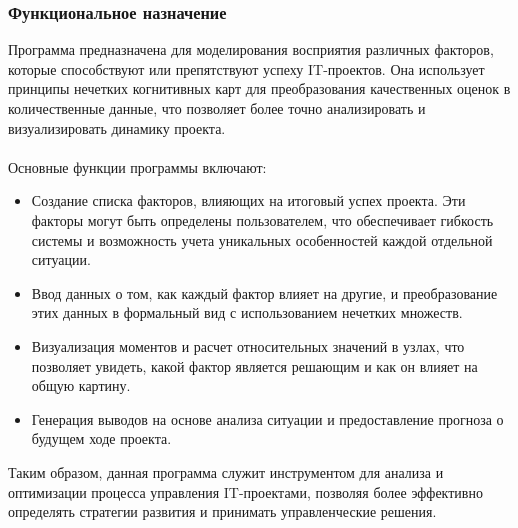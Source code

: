 \documentclass{article}
\begin{document}
    \subsubsection {Функциональное назначение}
    Программа предназначена для моделирования восприятия различных факторов, которые способствуют или препятствуют успеху IT-проектов. Она использует принципы нечетких когнитивных карт для преобразования качественных оценок в количественные данные, что позволяет более точно анализировать и визуализировать динамику проекта.\\
    ~\\
    Основные функции программы включают:
    \begin{itemize}
        \item Создание списка факторов, влияющих на итоговый успех проекта. Эти факторы могут быть определены пользователем, что обеспечивает гибкость системы и возможность учета уникальных особенностей каждой отдельной ситуации.
        \item Ввод данных о том, как каждый фактор влияет на другие, и преобразование этих данных в формальный вид с использованием нечетких множеств.
        \item Визуализация моментов и расчет относительных значений в узлах, что позволяет увидеть, какой фактор является решающим и как он влияет на общую картину.
        \item Генерация выводов на основе анализа ситуации и предоставление прогноза о будущем ходе проекта.
    \end{itemize}
    Таким образом, данная программа служит инструментом для анализа и оптимизации процесса управления IT-проектами, позволяя более эффективно определять стратегии развития и принимать управленческие решения.
\end{document}
